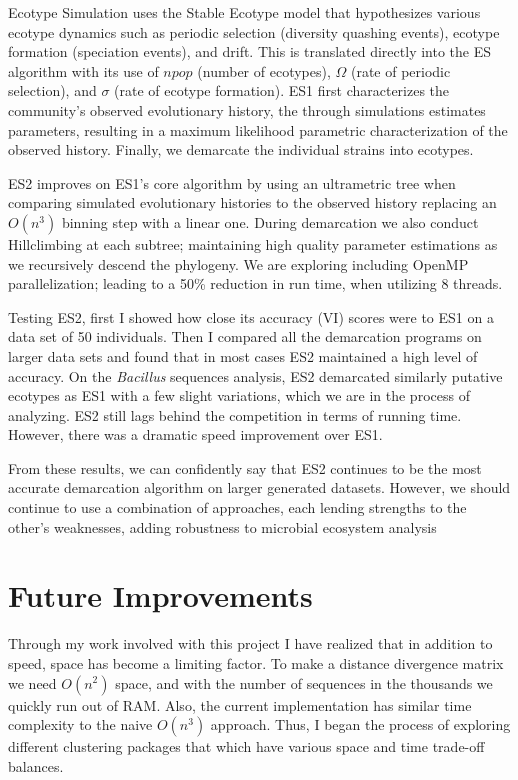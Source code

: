 Ecotype Simulation uses the Stable Ecotype model that hypothesizes various ecotype dynamics such as periodic selection (diversity quashing events), ecotype formation (speciation events), and drift.
This is translated directly into the ES algorithm with its use of $npop$ (number of ecotypes), $\Omega$ (rate of periodic selection), and $\sigma$ (rate of ecotype formation).
ES1 first characterizes the community's observed evolutionary history, the through simulations estimates parameters, resulting in a maximum likelihood parametric characterization of the observed history.
Finally, we demarcate the individual strains into ecotypes.

ES2 improves on ES1's core algorithm by using an ultrametric tree when comparing simulated evolutionary histories to the observed history replacing an $O(n^3)$ binning step with a linear one.
During demarcation we also conduct Hillclimbing at each subtree; maintaining high quality parameter estimations as we recursively descend the phylogeny.
We are exploring including OpenMP parallelization; leading to a 50\% reduction in run time, when utilizing 8 threads.

Testing ES2, first I showed how close its accuracy (VI) scores were to ES1 on a data set of 50 individuals.
Then I compared all the demarcation programs on larger data sets and found that in most cases ES2 maintained a high level of accuracy.
On the \emph{Bacillus} sequences analysis, ES2 demarcated similarly putative ecotypes as ES1 with a few slight variations, which we are in the process of analyzing.
ES2 still lags behind the competition in terms of running time.
However, there was a dramatic speed improvement over ES1.

From these results, we can confidently say that ES2 continues to be the most accurate demarcation algorithm on larger generated datasets. However, we should continue to use a combination of approaches, each lending strengths to the other's weaknesses, adding robustness to microbial ecosystem analysis~\cite{bohannan2003new}



\section{Future Improvements}
Through my work involved with this project I have realized that in addition to speed, space has become a limiting factor.
To make a distance divergence matrix we need $O(n^2)$ space, and with the number of sequences in the thousands we quickly run out of RAM.
Also, the current implementation has similar time complexity to the naive $O(n^3)$ approach.
Thus, I began the process of exploring different clustering packages that which have various space and time trade-off balances.

